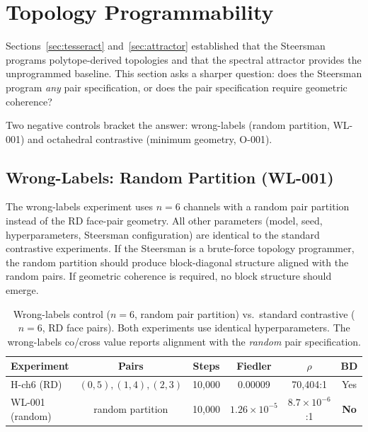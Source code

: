 \section{Topology Programmability}
\label{sec:programmability}

Sections~\ref{sec:tesseract} and~\ref{sec:attractor} established that
the Steersman programs polytope-derived topologies and that the
spectral attractor provides the unprogrammed baseline. This section
asks a sharper question: does the Steersman program \emph{any} pair
specification, or does the pair specification require geometric
coherence?

Two negative controls bracket the answer: wrong-labels (random
partition, WL-001) and octahedral contrastive (minimum geometry,
O-001).

\subsection{Wrong-Labels: Random Partition (WL-001)}

The wrong-labels experiment uses $n = 6$ channels with a random pair
partition instead of the RD face-pair geometry. All other parameters
(model, seed, hyperparameters, Steersman configuration) are identical
to the standard contrastive experiments.
If the Steersman is a brute-force topology programmer, the random
partition should produce block-diagonal structure aligned with the
random pairs. If geometric coherence is required, no block structure
should emerge.

\begin{table}[H]
\centering
\caption{Wrong-labels control ($n = 6$, random pair partition) vs.\
  standard contrastive ($n = 6$, RD face pairs). Both experiments use
  identical hyperparameters. The wrong-labels co/cross value reports
  alignment with the \emph{random} pair specification.}
\label{tab:wronglabels}
\small
\begin{tabular}{lccccc}
\toprule
Experiment & Pairs & Steps & Fiedler & $\rho$ & BD \\
\midrule
H-ch6 (RD) & $(0,5), (1,4), (2,3)$ & 10{,}000 & 0.00009 & 70{,}404:1 & Yes \\
WL-001 (random) & random partition & 10{,}000 & $1.26 \times 10^{-5}$ & $8.7 \times 10^{-6}$:1 & \textbf{No} \\
\bottomrule
\end{tabular}
\end{table}

